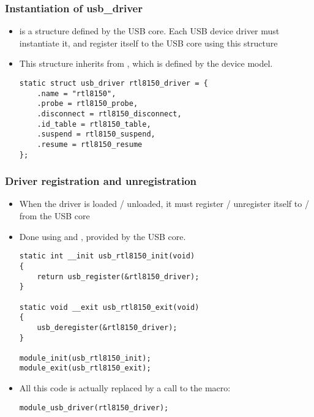 \begin{frame}[fragile]
  \frametitle{Instantiation of usb\_driver}
  \begin{itemize}
  \item {} is a structure defined by the USB
    core. Each USB device driver must instantiate it, and register
    itself to the USB core using this structure
  \item This structure inherits from ,
    which is defined by the device model.
    \begin{block}{}
  \begin{verbatim}
static struct usb_driver rtl8150_driver = {
    .name = "rtl8150",
    .probe = rtl8150_probe,
    .disconnect = rtl8150_disconnect,
    .id_table = rtl8150_table,
    .suspend = rtl8150_suspend,
    .resume = rtl8150_resume
};
  \end{verbatim}
  \end{block}
  \end{itemize}
\end{frame}

\begin{frame}[fragile]
  \frametitle{Driver registration and unregistration}
  \begin{itemize}
  \small
  \item When the driver is loaded / unloaded, it must register /
    unregister itself to / from the USB core
  \item Done using  and ,
    provided by the USB core.
    \begin{block}{}
\begin{verbatim}
static int __init usb_rtl8150_init(void)
{
    return usb_register(&rtl8150_driver);
}

static void __exit usb_rtl8150_exit(void)
{
    usb_deregister(&rtl8150_driver);
}

module_init(usb_rtl8150_init);
module_exit(usb_rtl8150_exit);
\end{verbatim}
\end{block}
\item All this code is actually replaced by a call to the  macro:
    \begin{block}{}
\begin{verbatim}
module_usb_driver(rtl8150_driver);
\end{verbatim}
\end{block}
  \end{itemize}
\end{frame}

